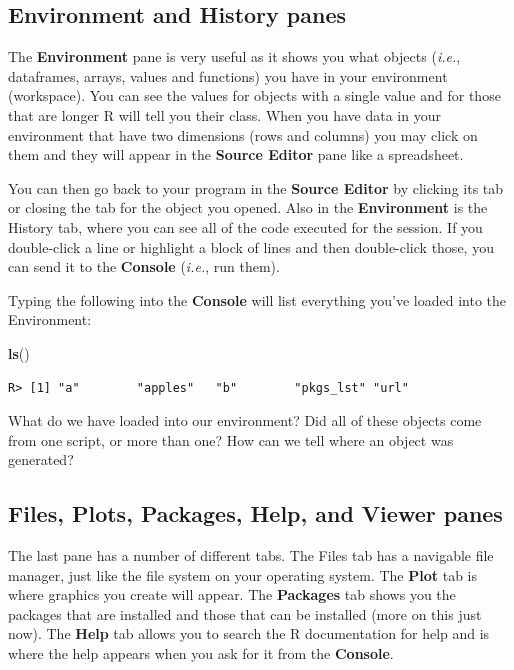 \documentclass[
]{book}
\newenvironment{Shaded}{\begin{snugshade}}{\end{snugshade}}
\newcommand{\KeywordTok}[1]{\textcolor[rgb]{0.13,0.29,0.53}{\textbf{#1}}}
\newcommand{\NormalTok}[1]{#1}
\begin{document}
\hypertarget{environment-and-history-panes}{%
\subsection{Environment and History panes}\label{environment-and-history-panes}}

The \textbf{Environment} pane is very useful as it shows you what objects (\emph{i.e.}, dataframes, arrays, values and functions) you have in your environment (workspace). You can see the values for objects with a single value and for those that are longer R will tell you their class. When you have data in your environment that have two dimensions (rows and columns) you may click on them and they will appear in the \textbf{Source Editor} pane like a spreadsheet.

You can then go back to your program in the \textbf{Source Editor} by clicking its tab or closing the tab for the object you opened. Also in the \textbf{Environment} is the History tab, where you can see all of the code executed for the session. If you double-click a line or highlight a block of lines and then double-click those, you can send it to the \textbf{Console} (\emph{i.e.}, run them).

Typing the following into the \textbf{Console} will list everything you've loaded into the Environment:

\begin{Shaded}
\begin{Highlighting}[]
\KeywordTok{ls}\NormalTok{()}
\end{Highlighting}
\end{Shaded}

\begin{verbatim}
R> [1] "a"        "apples"   "b"        "pkgs_lst" "url"
\end{verbatim}

What do we have loaded into our environment? Did all of these objects come from one script, or more than one? How can we tell where an object was generated?

\hypertarget{files-plots-packages-help-and-viewer-panes}{%
\subsection{Files, Plots, Packages, Help, and Viewer panes}\label{files-plots-packages-help-and-viewer-panes}}

The last pane has a number of different tabs. The Files tab has a navigable file manager, just like the file system on your operating system. The \textbf{Plot} tab is where graphics you create will appear. The \textbf{Packages} tab shows you the packages that are installed and those that can be installed (more on this just now). The \textbf{Help} tab allows you to search the R documentation for help and is where the help appears when you ask for it from the \textbf{Console}.
\end{document}
